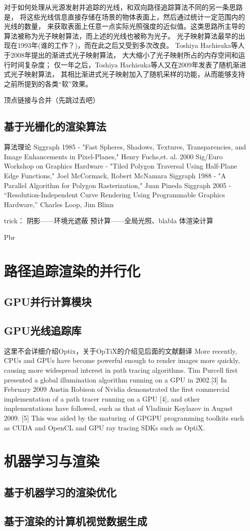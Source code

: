 对于如何处理从光源发射并追踪的光线，和双向路径追踪算法不同的另一条思路是，
将这些光线信息直接存储在场景的物体表面上，然后通过统计一定范围内的光线的数量，
来获取表面上任意一点实际光照强度的近似值。这类思路所主导的算法被称为光子映射算法，而上述的光线也被称为光子。
光子映射算法最早的出现在1993年(谁的工作？)，而在此之后又受到多次改良。
Toshiya Hachisuka等人于2008年提出的渐进式光子映射算法\cite{ProgressivePhotonMapping}，
大大缩小了光子映射所占的内存空间和运行时间复杂度；
仅一年之后，Toshiya Hachisuka等人又在2009年发表了随机渐进式光子映射算法\cite{StochasticProgressivePhotonMapping}，
其相比渐进式光子映射加入了随机采样的功能，从而能够支持之前所提到的各类“软”效果。

顶点链接与合并（先跳过去吧）



\subsection{基于光栅化的渲染算法}
算法理论
Siggraph 1985 - "Fast Spheres, Shadows, Textures, Transparencies, and Image Enhancements in Pixel-Planes," Henry Fuchs,et. al.
2000 Sig/Euro Workshop on Graphics Hardware - "Tiled Polygon Traversal Using Half-Plane Edge Functions," Joel McCormack, Robert McNamara
Siggraph 1988 - "A Parallel Algorithm for Polygon Rasterization,"  Juan Pineda
Siggraph 2005 - “Resolution-Independent Curve Rendering Using Programmable Graphics Hardware,” Charles Loop, Jim Blinn

trick：
阴影——环境光遮蔽
预计算——全局光照、blabla
体渲染计算

Pbr


\section{路径追踪渲染的并行化}
\subsection{GPU并行计算模块}
\subsection{GPU光线追踪库} 
这里不会详细介绍Optix，关于OpTiX的介绍见后面的文献翻译
More recently, CPUs and GPUs have become powerful enough to render images more quickly, causing more widespread interest in path tracing algorithms. Tim Purcell first presented a global illumination algorithm running on a GPU in 2002.[3] In February 2009 Austin Robison of Nvidia demonstrated the first commercial implementation of a path tracer running on a GPU [4], and other implementations have followed, such as that of Vladimir Koylazov in August 2009. [5] This was aided by the maturing of GPGPU programming toolkits such as CUDA and OpenCL and GPU ray tracing SDKs such as OptiX.
\section{机器学习与渲染}
\subsection{基于机器学习的渲染优化}
\subsection{基于渲染的计算机视觉数据生成}
